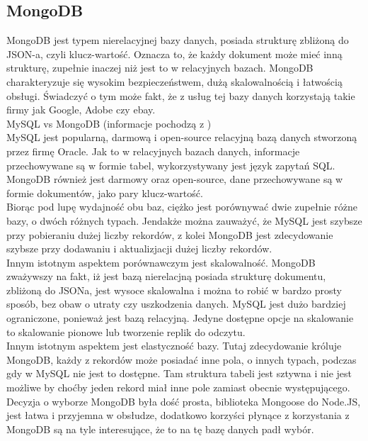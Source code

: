 \documentclass[12pt]{article}
\begin{document}
\begin{sloppypar}
{  \subsection{MongoDB}
  {
    MongoDB jest typem nierelacyjnej bazy danych, posiada strukturę zbliżoną do JSON-a, czyli klucz-wartość. Oznacza to, że każdy dokument może mieć inną strukturę, 
    zupełnie inaczej niż jest to w relacyjnych bazach. MongoDB charakteryzuje się wysokim bezpieczeństwem, dużą skalowalnością i łatwością obsługi. 
    Świadczyć o tym może fakt, że z usług tej bazy danych korzystają takie firmy jak Google, Adobe czy ebay. \\
    MySQL vs MongoDB (informacje pochodzą z \cite{mongovsmysql})\\
    MySQL jest popularną, darmową i open-source relacyjną bazą danych stworzoną przez firmę Oracle. Jak to w relacyjnych bazach danych, informacje przechowywane są w formie tabel, 
    wykorzystywany jest język zapytań SQL.\\
    MongoDB również jest darmowy oraz open-source, dane przechowywane są w formie dokumentów, jako pary klucz-wartość.\\
    Biorąc pod lupę wydajność obu baz, ciężko jest porównywać dwie zupełnie różne bazy, o dwóch różnych typach. Jendakże można zauważyć, że MySQL jest szybsze przy pobieraniu dużej liczby rekordów,
    z kolei MongoDB jest zdecydowanie szybsze przy dodawaniu i aktualizjacji dużej liczby rekordów.\\
    Innym istotnym aspektem porównawczym jest skalowalność. MongoDB zważywszy na fakt, iż jest bazą nierelacjną posiada strukturę dokumentu, zbliżoną do JSONa, jest wysoce skalowalna i 
    można to robić w bardzo prosty sposób, bez obaw o utraty czy uszkodzenia danych. MySQL jest dużo bardziej ograniczone, ponieważ jest bazą relacyjną. 
    Jedyne dostępne opcje na skalowanie to skalowanie pionowe lub tworzenie replik do odczytu.\\
    Innym istotnym aspektem jest elastyczność bazy. Tutaj zdecydowanie króluje MongoDB, każdy z rekordów może posiadać inne pola, o innych typach, podczas gdy w MySQL 
    nie jest to dostępne. Tam struktura tabeli jest sztywna i nie jest możliwe by choćby jeden rekord miał inne pole zamiast obecnie występującego. \\
    Decyzja o wyborze MongoDB była dość prosta, biblioteka Mongoose do Node.JS, jest łatwa i przyjemna w obsłudze, dodatkowo korzyści płynące z korzystania z MongoDB są na tyle 
    interesujące, że to na tę bazę danych padł wybór.
  }
}
\end{sloppypar}
\end{document}
